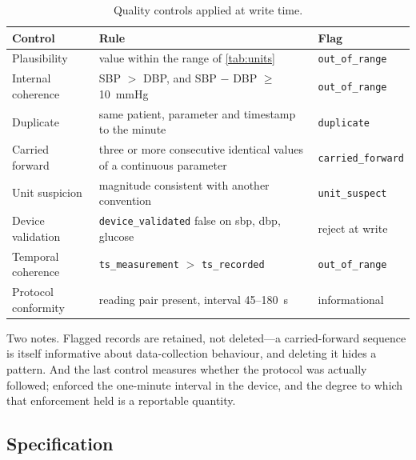 \documentclass[12pt,a4paper,oneside]{report}
\begin{document}
\begin{table}[htbp]
\centering\footnotesize
\caption{Quality controls applied at write time.}\label{tab:quality-controls}
\begin{tabularx}{\textwidth}{@{}>{\raggedright\arraybackslash}p{2.9cm} X >{\raggedright\arraybackslash}p{2.9cm}@{}}
\toprule
\textbf{Control} & \textbf{Rule} & \textbf{Flag} \\
\midrule
Plausibility & value within the range of \cref{tab:units} & \texttt{out\_of\_range} \\
Internal coherence & SBP $>$ DBP, and SBP $-$ DBP $\geq$ 10~mmHg & \texttt{out\_of\_range} \\
Duplicate & same patient, parameter and timestamp to the minute & \texttt{duplicate} \\
Carried forward & three or more consecutive identical values of a continuous parameter & \texttt{carried\_forward} \\
Unit suspicion & magnitude consistent with another convention & \texttt{unit\_suspect} \\
Device validation & \texttt{device\_validated} false on sbp, dbp, glucose & reject at write \\
Temporal coherence & \texttt{ts\_measurement} $>$ \texttt{ts\_recorded} & \texttt{out\_of\_range} \\
Protocol conformity & reading pair present, interval 45--180~s & informational \\
\bottomrule
\end{tabularx}
\end{table}

Two notes. Flagged records are retained, not deleted---a carried-forward sequence is itself informative about data-collection behaviour, and deleting it hides a pattern. And the last control measures whether the protocol was actually followed; \textcite{mihevc2025} enforced the one-minute interval in the device, and the degree to which that enforcement held is a reportable quantity.

\subsection{Specification}\label{sec:spec31}
\end{document}

